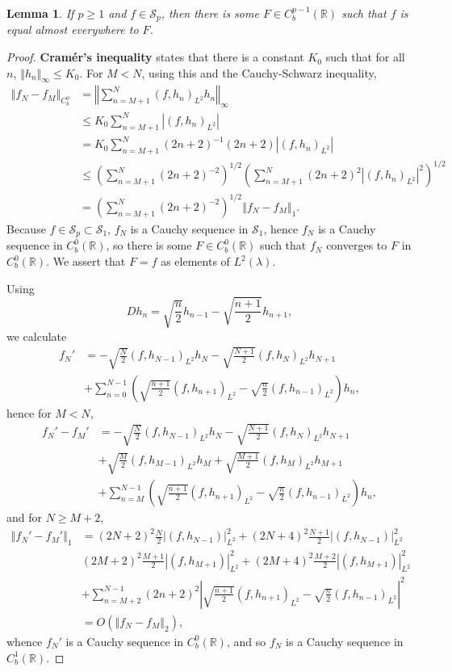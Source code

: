 \documentclass{article}
\newcommand{\norm}[1]{\left\Vert #1 \right\Vert}
\newtheorem{lemma}[theorem]{Lemma}
\theoremstyle{definition}
\begin{document}
\begin{lemma}
If $p \geq 1$ and $f \in \mathscr{S}_p$, then there is some $F \in C_b^{p-1}(\mathbb{R})$ such that
$f$ is equal almost everywhere to $F$.
\label{cramer}
\end{lemma}
\begin{proof}
\textbf{Cram\'er's inequality} states that there is a constant $K_0$ such that for all
$n$, $\norm{h_n}_\infty \leq K_0$. 
For $M < N$, using this and the Cauchy-Schwarz inequality,
\begin{align*}
\norm{f_N-f_M}_{C_b^0}&=\norm{ \sum_{n=M+1}^N (f,h_n)_{L^2} h_n}_\infty\\
&\leq K_0 \sum_{n=M+1}^N |(f,h_n)_{L^2}|\\
&= K_0 \sum_{n=M+1}^N (2n+2)^{-1} (2n+2)  |(f,h_n)_{L^2}|\\
&\leq \left( \sum_{n=M+1}^N (2n+2)^{-2}\right)^{1/2} 
\left( \sum_{n=M+1}^N (2n+2)^2   |(f,h_n)_{L^2}|^2 \right)^{1/2}\\
&= \left( \sum_{n=M+1}^N (2n+2)^{-2}\right)^{1/2} \norm{f_N-f_M}_1.
\end{align*}
Because $f \in \mathscr{S}_p \subset \mathscr{S}_1$, $f_N$ is a Cauchy sequence in $\mathscr{S}_1$, hence
$f_N$ is a Cauchy sequence in $C_b^0(\mathbb{R})$, so there is some $F \in C_b^0(\mathbb{R})$ such that
$f_N$ converges to $F$ in $C_b^0(\mathbb{R})$. 
We assert that $F=f$ as elements of $L^2(\lambda)$.

Using
\[
Dh_n= \sqrt{\frac{n}{2}} h_{n-1}-\sqrt{\frac{n+1}{2}} h_{n+1},
\]
we calculate
\begin{align*}
f_N' &= -\sqrt{\frac{N}{2}} (f,h_{N-1})_{L^2} h_N - \sqrt{\frac{N+1}{2}} (f,h_N)_{L^2} h_{N+1}\\
&+\sum_{n=0}^{N-1} \left( \sqrt{\frac{n+1}{2}} (f,h_{n+1})_{L^2}  - \sqrt{\frac{n}{2}} (f,h_{n-1})_{L^2}\right)h_n,
\end{align*}
hence for $M<N$,
\begin{align*}
f_N'-f_M'&= -\sqrt{\frac{N}{2}} (f,h_{N-1})_{L^2} h_N - \sqrt{\frac{N+1}{2}} (f,h_N)_{L^2} h_{N+1}\\
& +\sqrt{\frac{M}{2}} (f,h_{M-1})_{L^2} h_M + \sqrt{\frac{M+1}{2}} (f,h_M)_{L^2} h_{M+1}\\
&+\sum_{n=M}^{N-1} \left( \sqrt{\frac{n+1}{2}} (f,h_{n+1})_{L^2}  - \sqrt{\frac{n}{2}} (f,h_{n-1})_{L^2}\right)h_n,
\end{align*}
and for $N \geq M+2$,
\begin{align*}
\norm{f_N'-f_M'}_{1}&=(2N+2)^2 \frac{N}{2} |(f,h_{N-1})|_{L^2}^2 +(2N+4)^2 \frac{N+1}{2} |(f,h_{N-1})|_{L^2}^2\\
&(2M+2)^2 \frac{M+1}{2} |(f,h_{M+1})|_{L^2}^2+(2M+4)^2 \frac{M+2}{2} |(f,h_{M+1})|_{L^2}^2\\
&+\sum_{n=M+2}^{N-1} (2n+2)^2 \left| \sqrt{\frac{n+1}{2}} (f,h_{n+1})_{L^2}  - \sqrt{\frac{n}{2}} (f,h_{n-1})_{L^2}\right|^2\\
&=O(\norm{f_N-f_M}_2),
\end{align*}
whence
$f_N'$ is a Cauchy sequence in $C_b^0(\mathbb{R})$, and so $f_N$ is a Cauchy sequence in $C_b^1(\mathbb{R})$. 

\end{proof}
\end{document}
